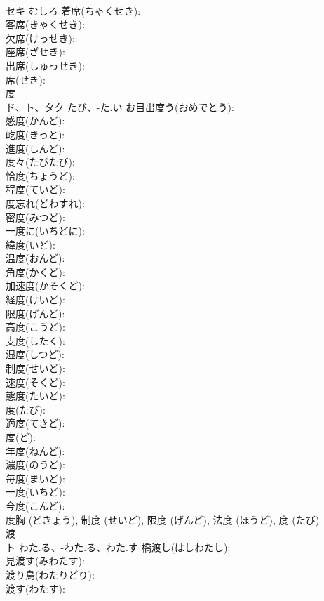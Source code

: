 \documentclass[8pt]{extreport}
\begin{document}
\begin{CJK}{UTF8}{min}
\\	セキ	むしろ	着席(ちゃくせき): 
\\	客席(きゃくせき): 
\\	欠席(けっせき): 
\\	座席(ざせき): 
\\	出席(しゅっせき): 
\\	席(せき): 
\\	度			
\\	ド、ト、タク	たび、-た.い	お目出度う(おめでとう): 
\\	感度(かんど): 
\\	屹度(きっと): 
\\	進度(しんど): 
\\	度々(たびたび): 
\\	恰度(ちょうど): 
\\	程度(ていど): 
\\	度忘れ(どわすれ): 
\\	密度(みつど): 
\\	一度に(いちどに): 
\\	緯度(いど): 
\\	温度(おんど): 
\\	角度(かくど): 
\\	加速度(かそくど): 
\\	経度(けいど): 
\\	限度(げんど): 
\\	高度(こうど): 
\\	支度(したく): 
\\	湿度(しつど): 
\\	制度(せいど): 
\\	速度(そくど): 
\\	態度(たいど): 
\\	度(たび): 
\\	適度(てきど): 
\\	度(ど): 
\\	年度(ねんど): 
\\	濃度(のうど): 
\\	毎度(まいど): 
\\	一度(いちど): 
\\	今度(こんど): 
\\	度胸 (どきょう), 制度 (せいど), 限度 (げんど), 法度 (ほうど), 度 (たび)
\\	渡			
\\	ト	わた.る、-わた.る、わた.す	橋渡し(はしわたし): 
\\	見渡す(みわたす): 
\\	渡り鳥(わたりどり): 
\\	渡す(わたす): 

\end{CJK}
\end{document}
